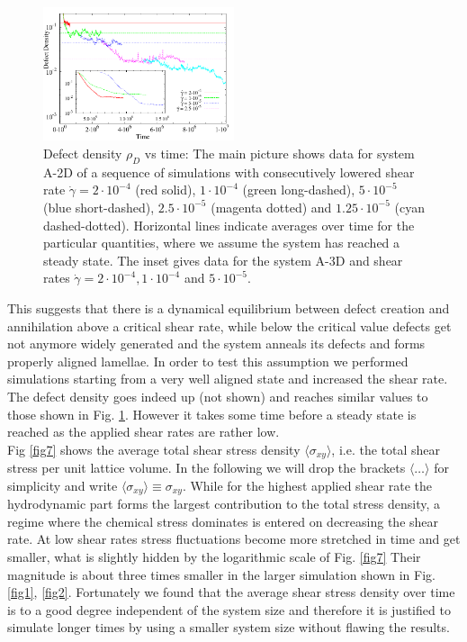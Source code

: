 \documentclass[8.5pt,twoside,twocolumn]{article}
\newcommand{\e}[1]{\cdot10^{#1}}
\begin{document}
\begin{figure}[htp!]
\centering
\includegraphics[angle=0,width=0.5\textwidth]{defect_density_5e-4.pdf}
\caption{Defect density $\rho_D$ vs time: The main picture shows data for system A-2D of a sequence of simulations with consecutively lowered shear rate $\dot{\gamma}=2\e{-4}$ (red solid), $1\e{-4}$ (green long-dashed),  $5\e{-5}$ (blue short-dashed),  $2.5\e{-5}$ (magenta dotted) and  $1.25\e{-5}$ (cyan dashed-dotted). Horizontal lines indicate averages over time for the particular quantities, where we assume the system has reached a steady state. The inset gives data for the system A-3D and shear rates $\dot{\gamma}=2\cdot10^{-4}, 1\cdot10^{-4}$ and $5\cdot10^{-5}$.} 
\label{fig6}
\end{figure}

This suggests that there is a dynamical equilibrium between defect creation and annihilation above a critical shear rate, while below the critical value defects get not anymore widely generated and the system anneals its defects and forms properly aligned lamellae.
In order to test this assumption we performed simulations starting from a very well aligned state and increased the shear rate.
The defect density goes indeed up (not shown) and reaches similar values to those shown in Fig. \ref{fig6}.
However it takes some time before a steady state is reached as the applied shear rates are rather low.\\
Fig \ref{fig7} shows the average total shear stress density $\langle \sigma_{xy}\rangle$, i.e. the total shear stress per unit lattice volume.
In the following we will drop the brackets $\langle\dots\rangle$ for simplicity and write $\langle \sigma_{xy}\rangle\equiv  \sigma_{xy}$.
While for the highest applied shear rate the hydrodynamic part forms the largest contribution to the total stress density, a regime where the chemical stress dominates is entered on decreasing the shear rate.
At low shear rates stress fluctuations become more stretched in time and get smaller, what is slightly hidden by the logarithmic scale of Fig. \ref{fig7}
Their magnitude is about three times smaller in the larger simulation shown in Fig. \ref{fig1}, \ref{fig2}.
Fortunately we found that the average shear stress density over time is to a good degree independent of the system size and therefore it is justified to simulate longer times by using a smaller system size without flawing the results.
\end{document}
